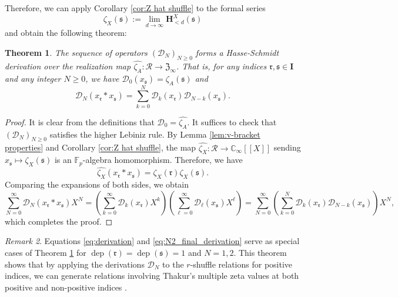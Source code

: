 \documentclass[12pt,reqno]{amsart}
\numberwithin{equation}{section}
\theoremstyle{plain}
\newtheorem{thm}{Theorem}[section]
\theoremstyle{definition}
\theoremstyle{remark}
\newtheorem{rmk}[thm]{Remark}
\newcommand{\CC}{\mathbb{C}}
\newcommand{\FF}{\mathbb{F}}
\newcommand{\Dcal}{\mathcal{D}}
\newcommand{\Rcal}{\mathcal{R}}
\newcommand{\dep}{\operatorname{dep}}
\newcommand{\mbb}[1]{[\![{#1}]\!]}
\newcommand{\ww}[1]{\mathfrak{#1}}
\renewcommand{\H}{\mathbf{H}}
\newcommand{\Ical}{\mathbf{I}}
\newcommand{\Zcal}{\mathfrak{Z}}
\begin{document}
Therefore, we can apply Corollary \ref{cor:Z hat shuffle} to the formal series $$\zeta_X(\ww{s}) := \lim_{d \to \infty} \H_{<d}^X(\ww{s})$$
and obtain the following theorem:

\begin{thm}\label{thm:D_N_derivation_rigorous}
    The sequence of operators $(\Dcal_N)_{N\geq 0}$ forms a Hasse-Schmidt derivation over the realization map $\widehat{\zeta_A}:\Rcal\to\Zcal_\infty$. That is, for any indices $\ww{r}, \ww{s} \in \Ical$ and any integer $N \ge 0$, we have
    $\Dcal_0(x_{\ww{s}})=\zeta_A(\ww{s})$ and
    $$\Dcal_N(x_{\ww{r}} \ast x_{\ww{s}}) = \sum_{k=0}^N \Dcal_k(x_{\ww{r}}) \Dcal_{N-k}(x_{\ww{s}}).$$
\end{thm}
\begin{proof}
    It is clear from the definitions that $\Dcal_0=\widehat{\zeta_A}$. It suffices to check that $(\Dcal_N)_{N\geq 0}$ satisfies the higher Lebiniz rule.
    By Lemma \ref{lem:v-bracket properties} and Corollary \ref{cor:Z hat shuffle}, the map $\widehat{\zeta_X} : \Rcal \to \CC_\infty\mbb{X}$ sending $x_{\ww{s}} \mapsto \zeta_X(\ww{s})$ is an $\FF_p$-algebra homomorphism. Therefore, we have 
    $$\widehat{\zeta_X}(x_{\ww{r}} \ast x_{\ww{s}}) = \zeta_X(\ww{r}) \zeta_X(\ww{s}).$$
    Comparing the expansions of both sides, we obtain
    $$\sum_{N=0}^{\infty} \Dcal_N(x_{\ww{r}} \ast x_{\ww{s}}) X^N = \left( \sum_{k=0}^{\infty} \Dcal_k(x_{\ww{r}}) X^k \right) \left( \sum_{\ell=0}^{\infty} \Dcal_\ell(x_{\ww{s}}) X^\ell \right)=\sum_{N=0}^\infty \left(\sum_{k=0}^N \Dcal_k(x_{\ww{r}}) \Dcal_{N-k}(x_{\ww{s}})\right)X^N,$$
    which completes the proof.
\end{proof}

\begin{rmk}
    Equations \eqref{eq:derivation} and \eqref{eq:N2_final_derivation} serve as special cases of Theorem \ref{thm:D_N_derivation_rigorous} for $\dep(\ww{r})=\dep(\ww{s})=1$ and $N=1,2$. This theorem shows that by applying the derivations $\Dcal_N$ to the $r$-shuffle relations for positive indices, we can generate relations involving Thakur's multiple zeta values at both positive and non-positive indices .
\end{rmk}
\end{document}
